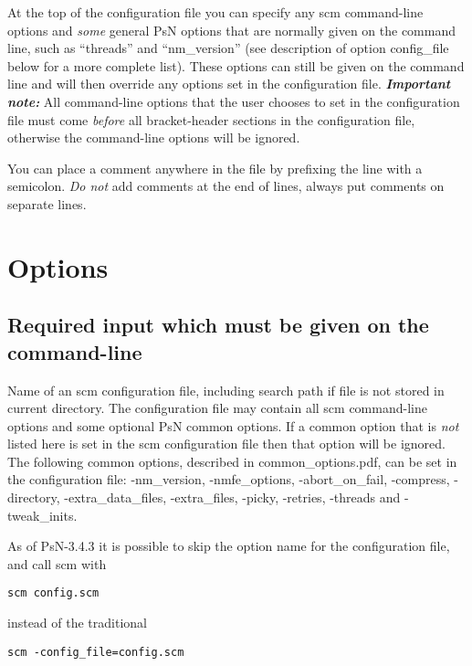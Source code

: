 At the top of the configuration file you can specify any scm command-line options and \emph{some} general PsN options that are normally given on the command line, such as “threads” and “nm\_version” (see description of option config\_file below for a more complete list). These options can still be given on the command line and will then override any options set in the configuration file. \emph{\textbf{Important note:}} All command-line options that the user chooses to set in the configuration file must come \emph{before} all bracket-header sections in the configuration file, otherwise the command-line options will be ignored.

You can place a comment anywhere in the file by prefixing the line with a semicolon. \emph{Do not} add comments at the end of lines, always put comments on separate lines.

\section{Options}
\subsection{Required input which must be given on the command-line}

\begin{optionlist}
Name of an scm configuration file, including search path if file is not stored in current directory. The configuration file may contain all scm command-line options and some optional PsN common options.
If a common option that is \emph{not} 
listed here is set in the scm configuration file then that option will be 
ignored.
The following common options, described in common\_options.pdf,
can be set in the configuration file: \mbox{-nm\_version}, \mbox{-nmfe\_options}, \mbox{-abort\_on\_fail}, \mbox{-compress}, \mbox{-directory}, \mbox{-extra\_data\_files}, \mbox{-extra\_files}, \mbox{-picky}, \mbox{-retries}, \mbox{-threads} and \mbox{-tweak\_inits}. 
\nextopt
\end{optionlist}

As of PsN-3.4.3 it is possible to skip the option name for the configuration file, and call scm with
\begin{verbatim}
scm config.scm 
\end{verbatim}
instead of the traditional
\begin{verbatim}
scm -config_file=config.scm
\end{verbatim}

